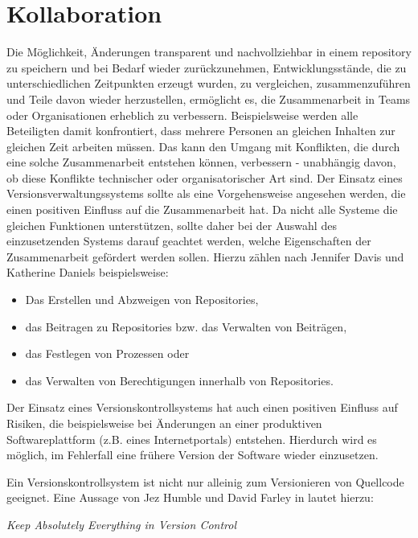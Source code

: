 \section{Kollaboration}\label{sec:collaboration}
Die Möglichkeit, Änderungen transparent und nachvollziehbar in einem
\gls{repository} zu speichern und bei Bedarf wieder zurückzunehmen,
Entwicklungsstände, die zu unterschiedlichen Zeitpunkten erzeugt wurden, zu
vergleichen, zusammenzuführen und Teile davon wieder herzustellen, ermöglicht
es, die Zusammenarbeit in Teams oder Organisationen erheblich zu verbessern.
Beispielsweise werden alle Beteiligten damit konfrontiert, dass mehrere
Personen an gleichen Inhalten zur gleichen Zeit arbeiten müssen. Das kann den
Umgang mit Konflikten, die durch eine solche Zusammenarbeit entstehen können,
verbessern - unabhängig davon, ob diese Konflikte technischer oder
organisatorischer Art sind. Der Einsatz eines Versionsverwaltungssystems sollte
als eine Vorgehensweise angesehen werden, die einen positiven Einfluss auf die
Zusammenarbeit hat. Da nicht alle Systeme die gleichen Funktionen unterstützen,
sollte daher bei der Auswahl des einzusetzenden Systems darauf geachtet werden,
welche Eigenschaften der Zusammenarbeit gefördert werden sollen. Hierzu zählen
nach Jennifer Davis und Katherine Daniels \cite[S.~178]{effdo} beispielsweise:

\begin{itemize}
\item Das Erstellen und Abzweigen von Repositories,
\item das Beitragen zu Repositories bzw. das Verwalten von Beiträgen,
\item das Festlegen von Prozessen oder
\item das Verwalten von Berechtigungen innerhalb von Repositories.
\end{itemize}

Der Einsatz eines Versionskontrollsystems hat auch einen positiven Einfluss auf
Risiken, die beispielsweise bei Änderungen an einer produktiven
Softwareplattform (z.B.  eines Internetportals) entstehen. Hierdurch wird es
möglich, im Fehlerfall eine frühere Version der Software wieder einzusetzen.
 \cite[S.~178]{effdo}

Ein Versionskontrollsystem ist nicht nur alleinig zum Versionieren von Quellcode geeignet.
Eine Aussage von Jez Humble und David Farley in \cite[S.~33]{cd} lautet hierzu:

\begin{center}
\textit{\glqq{}Keep Absolutely Everything in Version Control\grqq{}}
\end{center}

